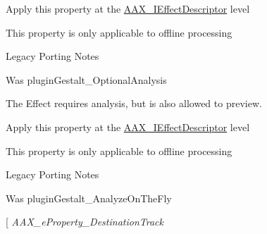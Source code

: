 \begin{Desc}
\begin{description}
\begin{DoxyItemize}
\item Apply this property at the \hyperlink{a00096}{A\+A\+X\+\_\+\+I\+Effect\+Descriptor} level \item This property is only applicable to offline processing\end{DoxyItemize}
\begin{DoxyRefDesc}{Legacy Porting Notes}
\item[\hyperlink{a00384__porting_notes000049}{Legacy Porting Notes}]Was plugin\+Gestalt\+\_\+\+Optional\+Analysis \end{DoxyRefDesc}
\item[{\em 
\hypertarget{a00283_a6571f4e41a5dd06e4067249228e2249ea9524773361ca8e712bef3547e8c46c9b}{}A\+A\+X\+\_\+e\+Property\+\_\+\+Allow\+Preview\+Without\+Analysis\label{a00283_a6571f4e41a5dd06e4067249228e2249ea9524773361ca8e712bef3547e8c46c9b}
}]The Effect requires analysis, but is also allowed to preview. \begin{DoxyItemize}
\item Apply this property at the \hyperlink{a00096}{A\+A\+X\+\_\+\+I\+Effect\+Descriptor} level \item This property is only applicable to offline processing\end{DoxyItemize}
\begin{DoxyRefDesc}{Legacy Porting Notes}
\item[\hyperlink{a00384__porting_notes000050}{Legacy Porting Notes}]Was plugin\+Gestalt\+\_\+\+Analyze\+On\+The\+Fly \end{DoxyRefDesc}
\item[{\em 
\hypertarget{a00283_a6571f4e41a5dd06e4067249228e2249eadd8839e5678c8880215e318197cc8d3a}{}A\+A\+X\+\_\+e\+Property\+\_\+\+Destination\+Track\label{a00283_a6571f4e41a5dd06e4067249228e2249eadd8839e5678c8880215e318197cc8d3a}
}
\end{description}
\end{Desc}
